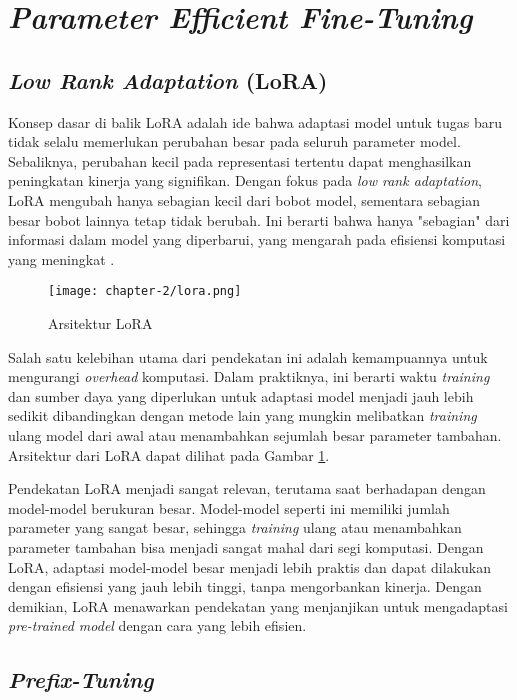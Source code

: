\section{\textit{Parameter Efficient Fine-Tuning}}

\subsection{\textit{Low Rank Adaptation} (LoRA)}

Konsep dasar di balik LoRA adalah ide bahwa adaptasi model untuk tugas baru tidak selalu memerlukan perubahan besar pada seluruh parameter model. Sebaliknya, perubahan kecil pada representasi tertentu dapat menghasilkan peningkatan kinerja yang signifikan. Dengan fokus pada \textit{low rank adaptation}, LoRA mengubah hanya sebagian kecil dari bobot model, sementara sebagian besar bobot lainnya tetap tidak berubah. Ini berarti bahwa hanya "sebagian" dari informasi dalam model yang diperbarui, yang mengarah pada efisiensi komputasi yang meningkat \parencite{lora}.

\begin{figure}[ht]
    \centering
    \texttt{[image: chapter-2/lora.png]}
    \caption{Arsitektur LoRA \parencite{lora}}
    \label{fig:lora}
\end{figure}

Salah satu kelebihan utama dari pendekatan ini adalah kemampuannya untuk mengurangi \textit{overhead} komputasi. Dalam praktiknya, ini berarti waktu \textit{training} dan sumber daya yang diperlukan untuk adaptasi model menjadi jauh lebih sedikit dibandingkan dengan metode lain yang mungkin melibatkan \textit{training} ulang model dari awal atau menambahkan sejumlah besar parameter tambahan. Arsitektur dari LoRA dapat dilihat pada Gambar \ref{fig:lora}.

Pendekatan LoRA menjadi sangat relevan, terutama saat berhadapan dengan model-model berukuran besar. Model-model seperti ini memiliki jumlah parameter yang sangat besar, sehingga \textit{training} ulang atau menambahkan parameter tambahan bisa menjadi sangat mahal dari segi komputasi. Dengan LoRA, adaptasi model-model besar menjadi lebih praktis dan dapat dilakukan dengan efisiensi yang jauh lebih tinggi, tanpa mengorbankan kinerja. Dengan demikian, LoRA menawarkan pendekatan yang menjanjikan untuk mengadaptasi \textit{pre-trained model} dengan cara yang lebih efisien.

\subsection{\textit{Prefix-Tuning}}

